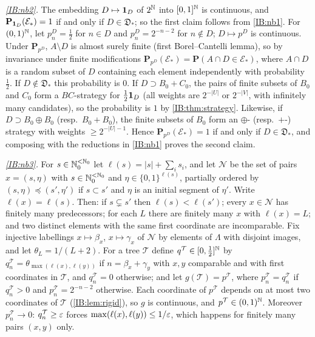 \emph{\ref{IB:nb2}.} The embedding $D\mapsto\mathbf{1}_D$ of $2^{\mathbb{N}}$ into $[0,1]^{\mathbb{N}}$ is continuous, and
$\mathbf P_{\mathbf{1}_D}(\mathcal E_\ast)=1$ if and only if $D\in\mathfrak D_\ast$; so the first claim follows
from \ref{IB:nb1}. For $(0,1)^{\mathbb{N}}$, let $p^D_n=\frac12$ for $n\in D$ and $p^D_n=2^{-n-2}$ for $n\notin D$;
$D\mapsto p^D$ is continuous. Under $\mathbf P_{p^D}$, $A\setminus D$ is almost surely finite (first
Borel--Cantelli lemma), so by invariance under finite modifications
$\mathbf P_{p^D}(\mathcal E_\ast)=\mathbf P(A\cap D\in\mathcal E_\ast)$, where $A\cap D$ is a random subset of $D$
containing each element independently with probability $\frac12$. If $D\notin\mathfrak D_\ast$
this probability is $0$. If $D\supset B_0+C_0$, the pairs of finite subsets of $B_0$
and $C_0$ form a $BC$-strategy for $\frac12\mathbf{1}_D$ (all weights are $2^{-|U|}$ or
$2^{-|V|}$, with infinitely many candidates), so the probability is $1$ by
\cref{IB:thm:strategy}. Likewise, if $D\supset B_0\oplus B_0$ (resp.\ $B_0+B_0$), the finite
subsets of $B_0$ form an $\oplus$- (resp.\ $+$-) strategy with weights $\ge2^{-|U|-1}$.
Hence $\mathbf P_{p^D}(\mathcal E_\ast)=1$ if and only if $D\in\mathfrak D_\ast$, and composing with the
reductions in \ref{IB:nb1} proves the second claim.

\emph{\ref{IB:nb3}.} For $s\in\mathbb{N}_0^{<\mathbb{N}_0}$ let $\ell(s)=|s|+\sum_is_i$, and let $\mathcal N$ be the
set of pairs $x=(s,\eta)$ with $s\in\mathbb{N}_0^{<\mathbb{N}_0}$ and $\eta\in\{0,1\}^{\ell(s)}$, partially ordered
by $(s,\eta)\preceq(s',\eta')$ if $s\subset s'$ and $\eta$ is an initial segment of $\eta'$. Write
$\ell(x)=\ell(s)$. Then: if $s\subsetneq s'$ then $\ell(s)<\ell(s')$; every $x\in\mathcal N$ has
finitely many predecessors; for each $L$ there are finitely many $x$ with $\ell(x)=L$;
and two distinct elements with the same first coordinate are incomparable. Fix
injective labellings $x\mapsto\beta_x$, $x\mapsto\gamma_x$ of $\mathcal N$ by elements of $\Lambda$ with
disjoint images, and let $\theta_L=1/(L+2)$. For a tree $\mathcal T$ define $q^{\mathcal T}\in[0,\frac12]^{\mathbb{N}}$ by
$q^{\mathcal T}_n=\theta_{\max(\ell(x),\ell(y))}$ if $n=\beta_x+\gamma_y$ with $x,y$ comparable and with
first coordinates in $\mathcal T$, and $q^{\mathcal T}_n=0$ otherwise; and let $g(\mathcal T)=p^{\mathcal T}$, where
$p^{\mathcal T}_n=q^{\mathcal T}_n$ if $q^{\mathcal T}_n>0$ and $p^{\mathcal T}_n=2^{-n-2}$ otherwise. Each coordinate of
$p^{\mathcal T}$ depends on at most two coordinates of $\mathcal T$ (\cref{IB:lem:rigid}), so $g$ is
continuous, and $p^{\mathcal T}\in(0,1)^{\mathbb{N}}$. Moreover $p^{\mathcal T}_n\to0$: $q^{\mathcal T}_n\ge\varepsilon$ forces
$\max(\ell(x),\ell(y))\le1/\varepsilon$, which happens for finitely many pairs $(x,y)$ only.

